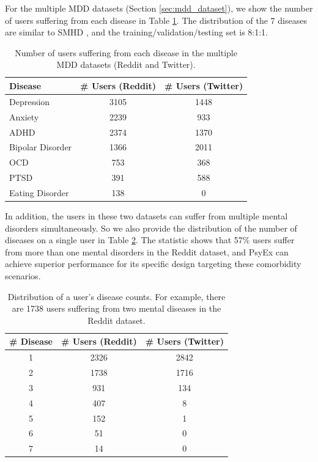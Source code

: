 For the multiple MDD datasets (Section \ref{sec:mdd_dataset}), we show the number of users suffering from each disease in Table \ref{tab:disease_detect_count}. The distribution of the 7 diseases are similar to SMHD \citep{cohan2018smhd}, and the  training/validation/testing set is 8:1:1. 
\begin{table}[th]
    \small
    \centering
    \begin{tabular}{l|cc}
    \hline
    Disease          & \# Users (Reddit) & \# Users (Twitter)\\
    \hline
    Depression       & 3105 & 1448         \\
    Anxiety          & 2239 & 933        \\
    ADHD             & 2374 & 1370        \\
    Bipolar Disorder & 1366 & 2011        \\
    OCD              & 753  & 368        \\
    PTSD             & 391  & 588        \\
    Eating Disorder  & 138  & 0        \\
    \hline
    \end{tabular}
    \caption{Number of users suffering from each disease in the multiple MDD datasets (Reddit and Twitter).}
    \label{tab:disease_detect_count}
\end{table}

In addition, the users in these two datasets can suffer from multiple mental disorders simultaneously. So we also provide the distribution of the number of diseases on a single user in Table \ref{tab:dis_num_distribution}. The statistic shows that 57\% users suffer from more than one mental disorders in the Reddit dataset, and PsyEx can achieve superior performance for its specific design targeting these comorbidity scenarios.
\begin{table}[th]
    \small
    \centering
    \begin{tabular}{c|cc}
    \hline
    \# Disease          & \# Users (Reddit) & \# Users (Twitter)\\
    \hline
    1   & 2326 & 2842         \\
    2   & 1738 & 1716        \\
    3   & 931  & 134       \\
    4   & 407  & 8       \\
    5   & 152  & 1        \\
    6   & 51   & 0       \\
    7   & 14   & 0  \\
    \hline
    \end{tabular}
    \caption{Distribution of a user's disease counts. For example, there are 1738 users suffering from two mental diseases in the Reddit dataset.}
    \label{tab:dis_num_distribution}
\end{table}

